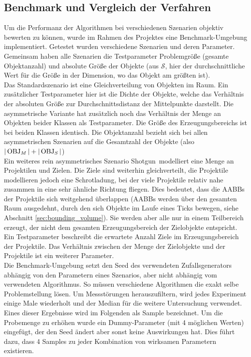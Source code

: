 \subsection{Benchmark und Vergleich der Verfahren}
\label{sec:benchmark}
Um die Performanz der Algorithmen bei verschiedenen Szenarien objektiv bewerten zu können, wurde im Rahmen des Projektes eine Benchmark-Umgebung implementiert. Getestet wurden verschiedene Szenarien und deren Parameter. Gemeinsam haben alle Szenarien die Testparameter Problemgröße (gesamte Objektanzahl) und absolute Größe der Objekte (aus $\mathcal{S}$, hier der durchschnittliche Wert für die Größe in der Dimension, wo das Objekt am größten ist).\\
Das Standardszenario ist eine Gleichverteilung von Objekten im Raum. 
Ein zusätzlicher Testparameter hier ist die Dichte der Objekte, welche das Verhältnis der absoluten Größe zur Durchschnittsdistanz der Mittelpunkte darstellt. Die asymmetrische Variante hat zusätzlich noch das Verhältnis der Menge an Objekten beider Klassen als Testparameter. Die Größe des Erzeugungsbereichs ist bei beiden Klassen identisch. Die Objektanzahl bezieht sich bei allen asymmetrischen Szenarien auf die Gesamtzahl der Objekte (also $|\operatorname{OBJ}_M| + |\operatorname{OBJ}_S|$)\\
Ein weiteres rein asymmetrisches Szenario \glqq Shotgun\grqq ~modelliert eine Menge an Projektilen und Zielen. Die Ziele sind weiterhin gleichverteilt, die Projektile modellieren jedoch eine Schrotladung, bei der viele Projektile relativ nahe zusammen in eine sehr ähnliche Richtung fliegen. Dies bedeutet, dass die AABBs der Projektile sich weitgehend überlappen (AABBs werden über den gesamten Raum ausgedehnt, durch den sich Objekte im Laufe eines Ticks bewegen, siehe Abschnitt \ref{sec:bounding_volume}). Sie werden aber alle nur in einem Teilbereich erzeugt, der nicht dem gesamten Erzeugungsbereich der Zielobjekte entspricht. Ein Testparameter beschreibt die erwartete Anzahl Ziele im Erzeugungsbereich der Projektile. Das Verhältnis zwischen der Menge der Zielobjekte und der Projektile ist ein weiterer Parameter.\\
Die Benchmark-Umgebung setzt den Seed des verwendeten Zufallsgenerators abhängig von den Parametern eines Szenarios, aber nicht abhängig vom verwendeten Algorithmus. So müssen verschiedene Algorithmen die exakt selbe Problemstellung lösen. Um Messstörungen herauszufiltern, wird jedes Experiment einige Male wiederholt und der Median für die weitere Untersuchung verwendet. Eines dieser Ergebnisse wird im Folgenden als Sample bezeichnet. Um die Probemenge zu erhöhen wurde ein Dummy-Parameter (mit 4 möglichen Werten) eingefügt, der den Seed ändert aber sonst keine Auswirkungen hat. Dies führt dazu, dass 4 Samples zu jeder Kombination von wirksamen Parametern existieren.\\

